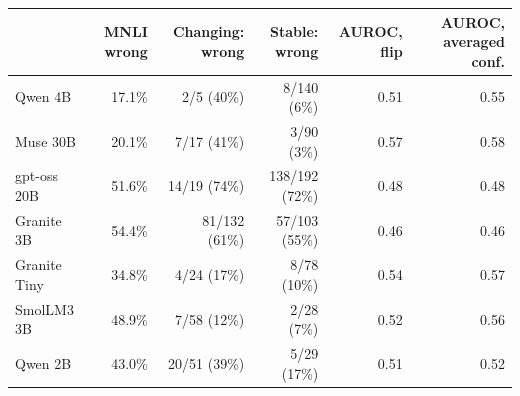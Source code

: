 \begin{tabular}{@{}lrrrrr@{}}
\toprule
 & MNLI wrong & Changing: wrong & Stable: wrong & AUROC, flip & AUROC, averaged conf. \\
\midrule
Qwen 4B & 17.1\% & 2/5 (40\%) & 8/140 (6\%) & 0.51 & 0.55 \\
Muse 30B & 20.1\% & 7/17 (41\%) & 3/90 (3\%) & 0.57 & 0.58 \\
gpt-oss 20B & 51.6\% & 14/19 (74\%) & 138/192 (72\%) & 0.48 & 0.48 \\
Granite 3B & 54.4\% & 81/132 (61\%) & 57/103 (55\%) & 0.46 & 0.46 \\
Granite Tiny & 34.8\% & 4/24 (17\%) & 8/78 (10\%) & 0.54 & 0.57 \\
SmolLM3 3B & 48.9\% & 7/58 (12\%) & 2/28 (7\%) & 0.52 & 0.56 \\
Qwen 2B & 43.0\% & 20/51 (39\%) & 5/29 (17\%) & 0.51 & 0.52 \\
\bottomrule
\end{tabular}
